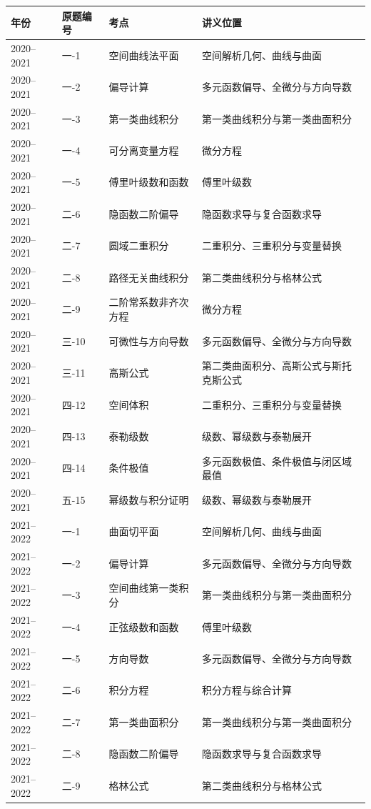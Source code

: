﻿\documentclass[11pt,a4paper,UTF8]{ctexart}
\begin{document}
\begin{longtable}{p{2.0cm}p{1.8cm}p{4.2cm}p{6.2cm}}
\toprule
\textbf{年份} & \textbf{原题编号} & \textbf{考点} & \textbf{讲义位置}\\
\midrule
2020--2021 & 一-1 & 空间曲线法平面 & 空间解析几何、曲线与曲面\\
2020--2021 & 一-2 & 偏导计算 & 多元函数偏导、全微分与方向导数\\
2020--2021 & 一-3 & 第一类曲线积分 & 第一类曲线积分与第一类曲面积分\\
2020--2021 & 一-4 & 可分离变量方程 & 微分方程\\
2020--2021 & 一-5 & 傅里叶级数和函数 & 傅里叶级数\\
2020--2021 & 二-6 & 隐函数二阶偏导 & 隐函数求导与复合函数求导\\
2020--2021 & 二-7 & 圆域二重积分 & 二重积分、三重积分与变量替换\\
2020--2021 & 二-8 & 路径无关曲线积分 & 第二类曲线积分与格林公式\\
2020--2021 & 二-9 & 二阶常系数非齐次方程 & 微分方程\\
2020--2021 & 三-10 & 可微性与方向导数 & 多元函数偏导、全微分与方向导数\\
2020--2021 & 三-11 & 高斯公式 & 第二类曲面积分、高斯公式与斯托克斯公式\\
2020--2021 & 四-12 & 空间体积 & 二重积分、三重积分与变量替换\\
2020--2021 & 四-13 & 泰勒级数 & 级数、幂级数与泰勒展开\\
2020--2021 & 四-14 & 条件极值 & 多元函数极值、条件极值与闭区域最值\\
2020--2021 & 五-15 & 幂级数与积分证明 & 级数、幂级数与泰勒展开\\
2021--2022 & 一-1 & 曲面切平面 & 空间解析几何、曲线与曲面\\
2021--2022 & 一-2 & 偏导计算 & 多元函数偏导、全微分与方向导数\\
2021--2022 & 一-3 & 空间曲线第一类积分 & 第一类曲线积分与第一类曲面积分\\
2021--2022 & 一-4 & 正弦级数和函数 & 傅里叶级数\\
2021--2022 & 一-5 & 方向导数 & 多元函数偏导、全微分与方向导数\\
2021--2022 & 二-6 & 积分方程 & 积分方程与综合计算\\
2021--2022 & 二-7 & 第一类曲面积分 & 第一类曲线积分与第一类曲面积分\\
2021--2022 & 二-8 & 隐函数二阶偏导 & 隐函数求导与复合函数求导\\
2021--2022 & 二-9 & 格林公式 & 第二类曲线积分与格林公式\\

\end{longtable}
\end{document}
